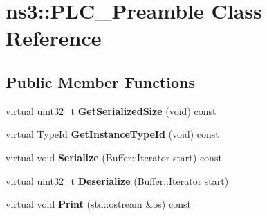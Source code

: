 \hypertarget{classns3_1_1PLC__Preamble}{\section{ns3\-:\-:\-P\-L\-C\-\_\-\-Preamble \-Class \-Reference}
\label{classns3_1_1PLC__Preamble}
}
\subsection*{\-Public \-Member \-Functions}
\begin{DoxyCompactItemize}
\item 
\hypertarget{classns3_1_1PLC__Preamble_a8867887b148f9527a3168a159ca717e9}{virtual uint32\-\_\-t {\bfseries \-Get\-Serialized\-Size} (void) const }\label{classns3_1_1PLC__Preamble_a8867887b148f9527a3168a159ca717e9}

\item 
\hypertarget{classns3_1_1PLC__Preamble_ace7e8a62cb91c513946274162ef3c5ba}{virtual \-Type\-Id {\bfseries \-Get\-Instance\-Type\-Id} (void) const }\label{classns3_1_1PLC__Preamble_ace7e8a62cb91c513946274162ef3c5ba}

\item 
\hypertarget{classns3_1_1PLC__Preamble_a0901cdbe23e7d78371c89fd8bb06cc6f}{virtual void {\bfseries \-Serialize} (\-Buffer\-::\-Iterator start) const }\label{classns3_1_1PLC__Preamble_a0901cdbe23e7d78371c89fd8bb06cc6f}

\item 
\hypertarget{classns3_1_1PLC__Preamble_aa9ac92d12a82c15f2691ea306a5cd714}{virtual uint32\-\_\-t {\bfseries \-Deserialize} (\-Buffer\-::\-Iterator start)}\label{classns3_1_1PLC__Preamble_aa9ac92d12a82c15f2691ea306a5cd714}

\item 
\hypertarget{classns3_1_1PLC__Preamble_a28a95f6dfc0e6fcf939e8e882ae6f3ff}{virtual void {\bfseries \-Print} (std\-::ostream \&os) const }\label{classns3_1_1PLC__Preamble_a28a95f6dfc0e6fcf939e8e882ae6f3ff}

\end{DoxyCompactItemize}
